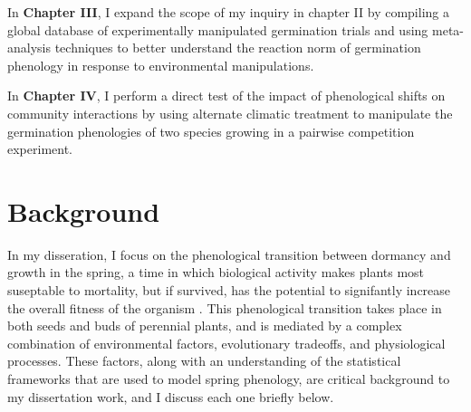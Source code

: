 \documentclass[12pt]{article}\usepackage[]{graphicx}\usepackage[]{color}
\begin{document}
\par In \textbf{Chapter III}, I expand the scope of my inquiry in chapter II by compiling a global database of experimentally manipulated germination trials and using meta-analysis techniques to better understand the reaction norm of germination phenology in response to environmental manipulations.
\par In \textbf{Chapter IV}, I perform a direct test of the impact of phenological shifts on community interactions by using alternate climatic treatment to manipulate the germination phenologies of two species growing in a pairwise competition experiment.

\section*{Background}
\indent\indent In my disseration, I focus on the phenological transition between dormancy and growth in the spring, a time in which biological activity makes plants most suseptable to mortality, but if survived, has the potential to signifantly increase the overall fitness of the organism \citep{Rathcke1985}. This phenological transition takes place in both seeds and buds of perennial plants, and is mediated by a complex combination of environmental factors, evolutionary tradeoffs, and physiological processes. These factors, along with an understanding of the statistical frameworks that are used to model spring phenology, are critical background to my dissertation work, and I discuss each one briefly below.\\
\end{document}
